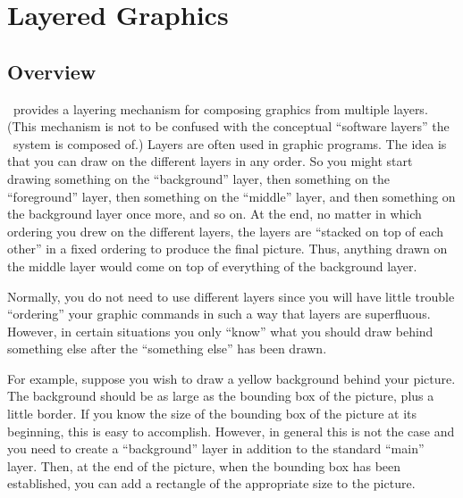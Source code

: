 %
%
%


\section{Layered Graphics}

\label{section-layers}

\subsection{Overview}

\pgfname\ provides a layering mechanism for composing graphics from
multiple layers. (This mechanism is not to be confused with the
conceptual ``software layers'' the \pgfname\ system is composed of.)
Layers are often used in graphic programs. The idea is that you can
draw on the different layers in any order. So you might start drawing
something on the ``background'' layer, then something on the
``foreground'' layer, then something on the ``middle'' layer, and then
something on the background layer once more, and so on. At the end, no
matter in which ordering you drew on the different layers, the layers
are ``stacked on top of each other'' in a fixed ordering to produce
the final picture. Thus, anything drawn on the middle layer would come
on top of everything of the background layer.

Normally, you do not need to use different layers since you will have
little trouble ``ordering'' your graphic commands in such a way that
layers are superfluous. However, in certain situations you only
``know'' what you should draw behind something else after the
``something else'' has been drawn.

For example, suppose you wish to draw a yellow background behind your
picture. The background should be as large as the bounding box of the
picture, plus a little border. If you know the size of the bounding box
of the picture at its beginning, this is easy to accomplish. However,
in general this is not the case and you need to create a
``background'' layer in addition to the standard ``main'' layer. Then,
at the end of the picture, when the bounding box has been established,
you can add a rectangle of the appropriate size to the picture.



